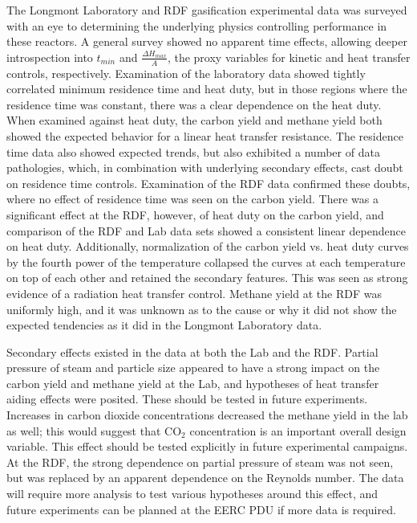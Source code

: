 \documentclass[11pt,twocolumn]{article}
\begin{document}
The Longmont Laboratory and RDF gasification experimental data was surveyed with an eye to determining the underlying physics controlling performance in these reactors.  A general survey showed no apparent time effects, allowing deeper introspection into $t_{min}$ and $\frac{\Delta H_{max}}{A}$, the proxy variables for kinetic and heat transfer controls, respectively.  Examination of the laboratory data showed tightly correlated minimum residence time and heat duty, but in those regions where the residence time was constant, there was a clear dependence on the heat duty.  When examined against heat duty, the carbon yield and methane yield both showed the expected behavior for a linear heat transfer resistance.  The residence time data also showed expected trends, but also exhibited a number of data pathologies, which, in combination with underlying secondary effects, cast doubt on residence time controls.  Examination of the RDF data confirmed these doubts, where no effect of residence time was seen on the carbon yield.  There was a significant effect at the RDF, however, of heat duty on the carbon yield, and comparison of the RDF and Lab data sets showed a consistent linear dependence on heat duty.  Additionally, normalization of the carbon yield vs. heat duty curves by the fourth power of the temperature collapsed the curves at each temperature on top of each other and retained the secondary features. This was seen as strong evidence of a radiation heat transfer control.  Methane yield at the RDF was uniformly high, and it was unknown as to the cause or why it did not show the expected tendencies as it did in the Longmont Laboratory data.

Secondary effects existed in the data at both the Lab and the RDF.  Partial pressure of steam and particle size appeared to have a strong impact on the carbon yield and methane yield at the Lab, and hypotheses of heat transfer aiding effects were posited.  These should be tested in future experiments.  Increases in carbon dioxide concentrations decreased the methane yield in the lab as well; this would suggest that CO$_2$ concentration is an important overall design variable.  This effect should be tested explicitly in future experimental campaigns.  At the RDF, the strong dependence on partial pressure of steam was not seen, but was replaced by an apparent dependence on the Reynolds number.  The data will require more analysis to test various hypotheses around this effect, and future experiments can be planned at the EERC PDU if more data is required.
\end{document}
